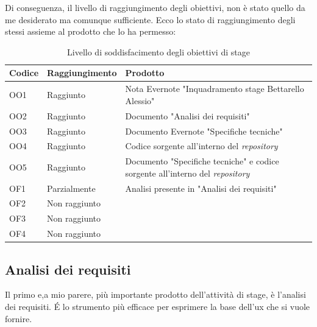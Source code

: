 Di conseguenza, il livello di raggiungimento degli obiettivi, non è stato quello da me desiderato ma comunque sufficiente.
Ecco lo stato di raggiungimento degli stessi assieme al prodotto che lo ha permesso:

\begin{table}[H]
    \centering
    \begin{tabular}{|m{}|m{}|m{}|}
    \hline
        \textbf{Codice} & \textbf{Raggiungimento} & \textbf{Prodotto} \\ \hline
        \rowcolor{green!15}
        OO1 & Raggiunto & Nota Evernote "Inquadramento stage Bettarello Alessio" \\ \hline
        \rowcolor{green!15}
        OO2 & Raggiunto & Documento "Analisi dei requisiti" \\ \hline
        \rowcolor{green!15}
        OO3 & Raggiunto & Documento Evernote "Specifiche tecniche" \\ \hline
        \rowcolor{green!15}
        OO4 & Raggiunto & Codice sorgente all'interno del \textit{repository} \\ \hline
        \rowcolor{green!15}
        OO5 & Raggiunto & Documento "Specifiche tecniche" e codice sorgente all'interno del
        \textit{repository} \\ \hline
        \rowcolor{orange!15}
        OF1 & Parzialmente & Analisi presente in "Analisi dei requisiti" \\ \hline
        \rowcolor{red!15}
        OF2 & Non raggiunto & \\ \hline
        \rowcolor{red!15}
        OF3 & Non raggiunto & \\ \hline
        \rowcolor{red!15}
        OF4 & Non raggiunto & \\ \hline
    \end{tabular}
    \caption{Livello di soddisfacimento degli obiettivi di stage}
    \label{tab:goalObiettivi}
\end{table}


\subsection{Analisi dei requisiti}
Il primo e,a mio parere, più importante prodotto dell'attività di stage, è l'analisi dei requisiti.
\'E lo strumento più efficace per esprimere la base dell'\acrshort{ux} che si vuole fornire.

